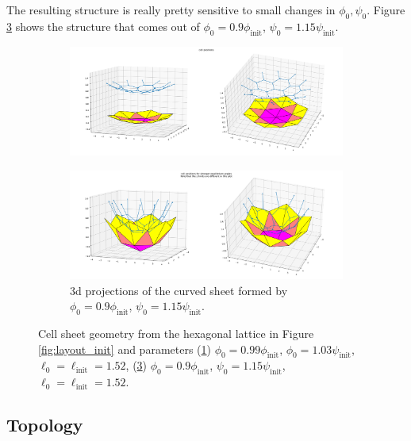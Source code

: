 The resulting structure is really pretty sensitive to small changes in $\phi_0, \psi_0$. Figure \ref{subfig:deep} shows the structure that comes out of $\phi_0 = 0.9 \phi_{\text{init}}$, $\psi_0 = 1.15\psi_{\text{init}}$. 

\begin{figure}[htbp]
    \centering
    \begin{subfigure}[b]{\textwidth}
        \centering 
        \includegraphics[width=\textwidth]{shallow.png}
        \caption{}
        \label{subfig:shallow}
    \end{subfigure}
    \begin{subfigure}[b]{\textwidth}
        \centering
        \includegraphics[width=\textwidth]{deep.png}
        \caption{3d projections of the curved sheet formed by $\phi_0 = 0.9 \phi_{\text{init}}$, $\psi_0 = 1.15\psi_{\text{init}}$. }
        \label{subfig:deep}
    \end{subfigure}
    \caption{Cell sheet geometry from the hexagonal lattice in Figure \ref{fig:layout_init} and parameters (\ref{subfig:shallow}) $\phi_0 = 0.99 \phi_{\text{init}}$, $\phi_0 = 1.03 \psi_{\text{init}}$, $\ell_0 = \ell_{\text{init}}=1.52$, (\ref{subfig:deep}) $\phi_0 = 0.9 \phi_{\text{init}}$, $\psi_0 = 1.15\psi_{\text{init}}$, $\ell_0 = \ell_{\text{init}}=1.52$. }
\end{figure}

\subsection{Topology}

